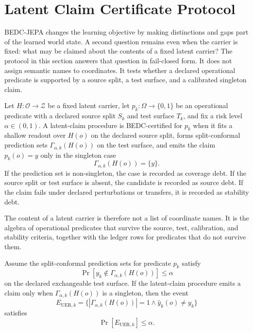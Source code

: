 \section{Latent Claim Certificate Protocol}
\label{sec:latent-claim-certificate}

BEDC-JEPA changes the learning objective by making distinctions and gaps part
of the learned world state.  A second question remains even when the carrier
is fixed: what may be claimed about the contents of a fixed latent carrier?
The protocol in this section answers that question in fail-closed form.  It
does not assign semantic names to coordinates.  It tests whether a declared
operational predicate is supported by a source split, a test surface, and a
calibrated singleton claim.

\begin{definition}
Let $H:\mathcal O\to\mathcal Z$ be a fixed latent carrier, let
$p_k:\Omega\to\{0,1\}$ be an operational predicate with a declared source
split $S_k$ and test surface $T_k$, and fix a risk level $\alpha\in(0,1)$.
A latent-claim procedure is BEDC-certified for $p_k$ when it fits a shallow
readout over $H(o)$ on the declared source split, forms split-conformal
prediction sets $\Gamma_{\alpha,k}(H(o))$ on the test surface, and emits the
claim $p_k(o)=y$ only in the singleton case
$$
  \Gamma_{\alpha,k}(H(o))=\{y\}.
$$
If the prediction set is non-singleton, the case is recorded as coverage debt.
If the source split or test surface is absent, the candidate is recorded as
source debt.  If the claim fails under declared perturbations or transfers, it
is recorded as stability debt.
\end{definition}

The content of a latent carrier is therefore not a list of coordinate names.
It is the algebra of operational predicates that survive the source, test,
calibration, and stability criteria, together with the ledger rows for predicates
that do not survive them.

\begin{proposition}
Assume the split-conformal prediction sets for predicate $p_k$ satisfy
$$
  \Pr[
    y_k \notin \Gamma_{\alpha,k}(H(o))
  ]
  \le \alpha
$$
on the declared exchangeable test surface.  If the latent-claim procedure
emits a claim only when $\Gamma_{\alpha,k}(H(o))$ is a singleton, then the
event
$$
  E_{\mathrm{UER},k}
  =
  \{
    |\Gamma_{\alpha,k}(H(o))|=1
    \wedge
    \hat y_k(o)\ne y_k
  \}
$$
satisfies
$$
  \Pr[E_{\mathrm{UER},k}]
  \le \alpha .
$$
\end{proposition}

